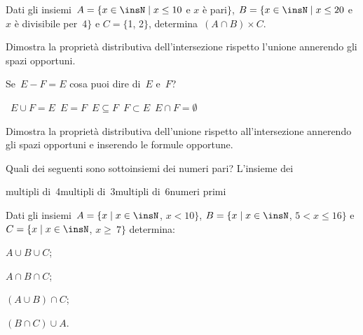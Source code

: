 \begin{esercizio}
\label{ese:\thechapter.124}
Dati gli insiemi~$A=\{x\in\insN\mid x\le 10$ e $x$ è pari$\}$,
$B=\{x\in\insN\mid x\le 20$ e $x$ è divisibile per~4$\}$ e
$C=\{$1, 2$\}$, determina~$(A\cap B)\times C$.
\end{esercizio}

\begin{esercizio}
\label{ese:\thechapter.125}
Dimostra la proprietà distributiva dell'intersezione rispetto l'unione annerendo gli spazi opportuni.
\begin{center}
 
\end{center}
\end{esercizio}

\begin{esercizio}
\label{ese:\thechapter.126}
Se~$E-F=E$ cosa puoi dire di~$E$ e~$F$?
\begin{center}
 \boxA\quad~$E\cup F=E$\quad\boxB\quad~$E=F$\quad\boxC\quad~$E\subseteq F$\quad\boxD\quad~$F\subset E$\quad\boxE\quad~$E\cap F=\emptyset $
\end{center}
\end{esercizio}

\begin{esercizio}
\label{ese:\thechapter.127}
Dimostra la proprietà distributiva dell'unione rispetto all'intersezione annerendo gli spazi opportuni
e inserendo le formule opportune.
\begin{center}
 
\end{center}
\end{esercizio}

\begin{esercizio}
\label{ese:\thechapter.128}
Quali dei seguenti sono sottoinsiemi dei numeri pari? L'insieme dei

\begin{center}
 \boxA\quad multipli di~4\quad\boxB\quad multipli di~3\quad\boxC\quad multipli di~6\quad\boxD\quad numeri primi
\end{center}
\end{esercizio}

\begin{esercizio}
\label{ese:\thechapter.129}
Dati gli insiemi~$A=\{x\mid x\in\insN$, $x<10\}$, $B=\{x\mid x\in\insN$, $5<x\le 16\}$ e
$C=\{x\mid x\in\insN$, $x\ge~7\}$ determina:
\begin{multicols}{4}
\begin{enumeratea}
\item $A\cup B\cup C$;
\item $A\cap B\cap C$;
\item $(A\cup B)\cap C$;
\item $(B\cap C)\cup A$.
\end{enumeratea}
\end{multicols}
\end{esercizio}

